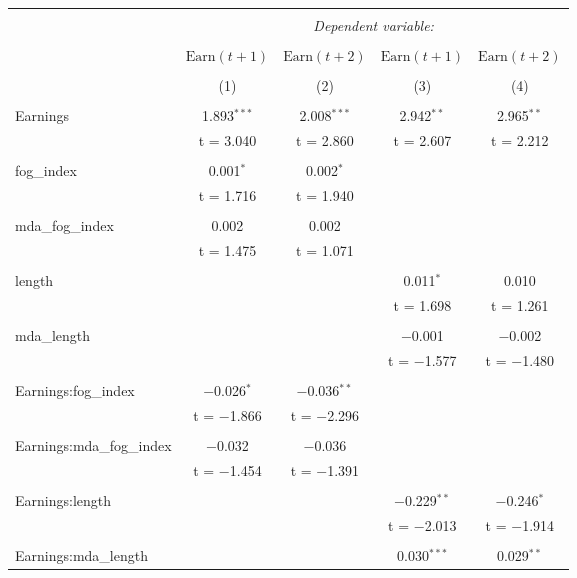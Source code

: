 \documentclass[a4paper]{article}
\begin{document}
\begin{center} 
\begin{longtable}{@{\extracolsep{5pt}}lcccc} 
\\[-1.8ex]\hline 
\hline \\[-1.8ex] 
 & \multicolumn{4}{c}{\textit{Dependent variable:}} \\ 
\cline{2-5} 
\\[-1.8ex] & \(\text{Earn}(t{+}1)\) & \(\text{Earn}(t{+}2)\) & \(\text{Earn}(t{+}1)\) & \(\text{Earn}(t{+}2)\) \\ 
\\[-1.8ex] & (1) & (2) & (3) & (4)\\ 
\hline \\[-1.8ex] 
 Earnings & 1.893$^{***}$ & 2.008$^{***}$ & 2.942$^{**}$ & 2.965$^{**}$ \\ 
  & t = 3.040 & t = 2.860 & t = 2.607 & t = 2.212 \\ 
  & & & & \\ 
 fog\_index & 0.001$^{*}$ & 0.002$^{*}$ &  &  \\ 
  & t = 1.716 & t = 1.940 &  &  \\ 
  & & & & \\ 
 mda\_fog\_index & 0.002 & 0.002 &  &  \\ 
  & t = 1.475 & t = 1.071 &  &  \\ 
  & & & & \\ 
 length &  &  & 0.011$^{*}$ & 0.010 \\ 
  &  &  & t = 1.698 & t = 1.261 \\ 
  & & & & \\ 
 mda\_length &  &  & $-$0.001 & $-$0.002 \\ 
  &  &  & t = $-$1.577 & t = $-$1.480 \\ 
  & & & & \\ 
 Earnings:fog\_index & $-$0.026$^{*}$ & $-$0.036$^{**}$ &  &  \\ 
& t = $-$1.866 & t = $-$2.296 &  &  \\ 
  & & & & \\ 
 Earnings:mda\_fog\_index & $-$0.032 & $-$0.036 &  &  \\ 
  & t = $-$1.454 & t = $-$1.391 &  &  \\ 
  & & & & \\ 
 Earnings:length &  &  & $-$0.229$^{**}$ & $-$0.246$^{*}$ \\ 
  &  &  & t = $-$2.013 & t = $-$1.914 \\ 
  & & & & \\ 
 Earnings:mda\_length &  &  & 0.030$^{***}$ & 0.029$^{**}$ \\ 

\end{longtable}
\end{center}
\end{document}
